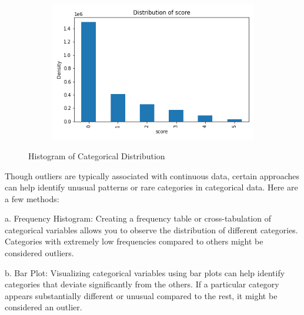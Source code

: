 \documentclass{article}
\begin{document}
\begin{itemize}
\begin{figure}[htbp]
\begin{subfigure}{0.3\textwidth}
            \end{subfigure}
            \begin{subfigure}{0.3\textwidth}
                \centering
                \includegraphics[width=\linewidth]{pic/hist/Distribution score.png}
            \end{subfigure}
            \caption{Histogram of Categorical Distribution}
            \label{fig:histogram Categorical}
            \end{figure}
           
           Though outliers are typically associated with continuous data, certain approaches can help identify unusual patterns or rare categories in categorical data. Here are a few methods:

                a. Frequency Histogram:
                Creating a frequency table or cross-tabulation of categorical variables allows you to observe the distribution of different categories. Categories with extremely low frequencies compared to others might be considered outliers.

                b. Bar Plot:
                Visualizing categorical variables using bar plots can help identify categories that deviate significantly from the others. If a particular category appears substantially different or unusual compared to the rest, it might be considered an outlier.

            

\end{itemize}
\end{document}
